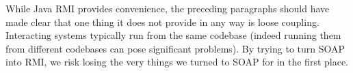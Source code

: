 While Java RMI provides convenience, the preceding paragraphs
should have made clear that one thing it does not provide in any way
is loose coupling. Interacting systems typically run from the same
codebase (indeed running them from different codebases can pose
significant problems). By trying to turn SOAP into RMI, we risk losing
the very things we turned to SOAP for in the first place.







